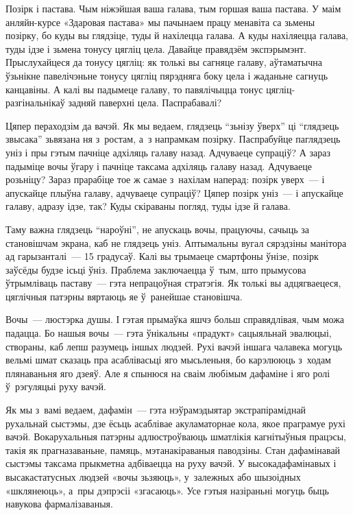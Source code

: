 Позірк і пастава. Чым ніжэйшая ваша галава, тым горшая ваша пастава. У маім анляйн-курсе «Здаровая пастава» мы пачынаем працу менавіта са зьмены позірку, бо куды вы глядзіце, туды й нахілецца галава. А куды нахіляецца галава, туды ідзе і зьмена тонусу цягліц цела. Давайце правядзём экспэрымэнт. Прыслухайцеся да тонусу цягліц: як толькі вы сагняце галаву, аўтаматычна ўзьнікне павелічэньне тонусу цягліц пярэдняга боку цела і жаданьне сагнуць канцавіны. А калі вы падымеце галаву, то павялічыцца тонус цягліц-разгінальнікаў задняй паверхні цела. Паспрабавалі?

Цяпер пераходзім да вачэй. Як мы ведаем, глядзець ``зьнізу ўверх'' ці ``глядзець звысака'' зьвязана ня з~ростам, а~з напрамкам позірку. Паспрабуйце паглядзець уніз і пры гэтым пачніце адхіляць галаву назад. Адчуваеце супраціў? А зараз падыміце вочы ўгару і пачніце таксама адхіляць галаву назад. Адчуваеце розьніцу? Зараз прарабіце тое ж самае з~нахілам наперад: позірк уверх~--- і апускайце плыўна галаву, адчуваеце супраціў? Цяпер позірк уніз~--- і апускайце галаву, адразу ідзе, так? Куды скіраваны погляд, туды ідзе й галава.

Таму важна глядзець ``нароўні'', не апускаць вочы, працуючы, сачыць за становішчам экрана, каб не глядзець уніз. Аптымальны вугал сярэдзіны манітора ад гарызанталі~--- 15 градусаў. Калі вы трымаеце смартфоны ўнізе, позірк заўсёды будзе ісьці ўніз. Праблема заключаецца ў~тым, што прымусова ўтрымліваць паставу~--- гэта непрацоўная стратэгія. Як толькі вы адцягваецеся, цяглічныя патэрны вяртаюць яе ў~ранейшае становішча.

Вочы~--- люстэрка душы. І гэтая прымаўка яшчэ больш справядлівая, чым можа падацца. Бо нашыя вочы~--- гэта ўнікальны «прадукт» сацыяльнай эвалюцыі, створаны, каб лепш разумець іншых людзей. Рухі вачэй іншага чалавека могуць вельмі шмат сказаць пра асаблівасьці яго мысьленьня, бо карэлююць з~ходам плянаваньня яго дзеяў. Але я спынюся на сваім любімым дафаміне і яго ролі ў~рэгуляцыі руху вачэй.

Як мы з~вамі ведаем, дафамін~--- гэта нэўрамэдыятар экстрапіраміднай рухальнай сыстэмы, дзе ёсьць асаблівае акуламаторнае кола, якое праграмуе рухі вачэй. Вокарухальныя патэрны адлюстроўваюць шматлікія кагнітыўныя працэсы, такія як прагназаваньне, памяць, мэтанакіраваныя паводзіны. Стан дафамінавай сыстэмы таксама прыкметна адбіваецца на руху вачэй. У высокадафамінавых і высакастатусных людзей «вочы зьзяюць», у~залежных або шызоідных «шклянеюць», а~пры дэпрэсіі «згасаюць». Усе гэтыя назіраньні могуць быць навукова фармалізаваныя.

